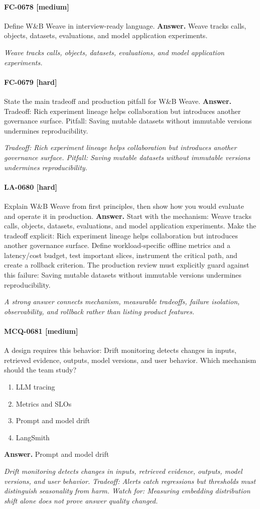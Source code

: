 \paragraph{FC-0678 [medium]} Define W\&B Weave in interview-ready language.
\noindent\textbf{Answer.} Weave tracks calls, objects, datasets, evaluations, and model application experiments.
\par\textit{Weave tracks calls, objects, datasets, evaluations, and model application experiments.}
\paragraph{FC-0679 [hard]} State the main tradeoff and production pitfall for W\&B Weave.
\noindent\textbf{Answer.} Tradeoff: Rich experiment lineage helps collaboration but introduces another governance surface. Pitfall: Saving mutable datasets without immutable versions undermines reproducibility.
\par\textit{Tradeoff: Rich experiment lineage helps collaboration but introduces another governance surface. Pitfall: Saving mutable datasets without immutable versions undermines reproducibility.}
\paragraph{LA-0680 [hard]} Explain W\&B Weave from first principles, then show how you would evaluate and operate it in production.
\noindent\textbf{Answer.} Start with the mechanism: Weave tracks calls, objects, datasets, evaluations, and model application experiments. Make the tradeoff explicit: Rich experiment lineage helps collaboration but introduces another governance surface. Define workload-specific offline metrics and a latency/cost budget, test important slices, instrument the critical path, and create a rollback criterion. The production review must explicitly guard against this failure: Saving mutable datasets without immutable versions undermines reproducibility.
\par\textit{A strong answer connects mechanism, measurable tradeoffs, failure isolation, observability, and rollback rather than listing product features.}
\paragraph{MCQ-0681 [medium]} A design requires this behavior: Drift monitoring detects changes in inputs, retrieved evidence, outputs, model versions, and user behavior. Which mechanism should the team study?
\begin{enumerate}[label=\Alph*.]
\item LLM tracing
\item Metrics and SLOs
\item Prompt and model drift
\item LangSmith
\end{enumerate}
\noindent\textbf{Answer.} Prompt and model drift
\par\textit{Drift monitoring detects changes in inputs, retrieved evidence, outputs, model versions, and user behavior. Tradeoff: Alerts catch regressions but thresholds must distinguish seasonality from harm. Watch for: Measuring embedding distribution shift alone does not prove answer quality changed.}
